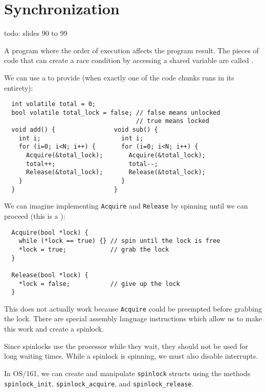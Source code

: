 \chapter{Synchronization}
todo: slides 90 to 99

\begin{defn}
  A program where the order of execution affects the program result.
  The pieces of code that can create a race condition
  by accessing a shared variable are called .
\end{defn}

We can use a  to provide 
(when exactly one of the code chunks runs in its entirety):

\begin{verbatim}
  int volatile total = 0;
  bool volatile total_lock = false; // false means unlocked
                                    // true means locked
  void add() {                void sub() {
    int i;                      int i;
    for (i=0; i<N; i++) {       for (i=0; i<N; i++) {
      Acquire(&total_lock);       Acquire(&total_lock);
      total++;                    total--;
      Release(&total_lock);       Release(&total_lock);
    }                           }
  }                           }
\end{verbatim}

We can imagine implementing \texttt{Acquire} and \texttt{Release}
by spinning until we can proceed (this is a ):

\begin{verbatim}
  Acquire(bool *lock) {
    while (*lock == true) {} // spin until the lock is free
    *lock = true;            // grab the lock
  }

  Release(bool *lock) {
    *lock = false;           // give up the lock
  }
\end{verbatim}

This does not actually work because \texttt{Acquire}
could be preempted before grabbing the lock.
There are special assembly language instructions
which allow us to make this work and create a spinlock.

Since spinlocks use the processor while they wait,
they should not be used for long waiting times.
While a spinlock is spinning, we must also disable interrupts.

In OS/161, we can create and manipulate \texttt{spinlock} structs
using the methods \texttt{spinlock_init},
\texttt{spinlock_acquire}, and \texttt{spinlock_release}.

